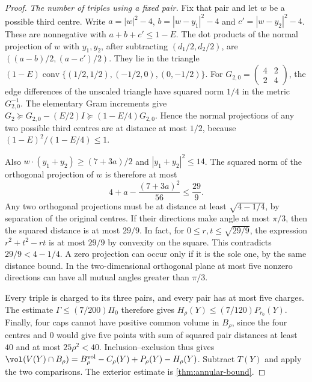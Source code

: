 \begin{proof}
\emph{The number of triples using a fixed pair.}
Fix that pair and let \(w\) be a possible third centre.
Write \(a=|w|^2-4\), \(b=|w-y_1|^2-4\) and
\(c'=|w-y_2|^2-4\). These are nonnegative with
\(a+b+c'\le1-E\).
The dot products of the normal projection of \(w\) with
\(y_1,y_2\), after subtracting \((d_1/2,d_2/2)\), are
\(((a-b)/2,(a-c')/2)\). They lie in the triangle
\((1-E)\operatorname{conv}\{(1/2,1/2),(-1/2,0),(0,-1/2)\}\).
For \(G_{2,0}=\left(\begin{smallmatrix}4&2\\2&4\end{smallmatrix}\right)\),
the edge differences of the unscaled triangle have squared
norm \(1/4\) in the metric \(G_{2,0}^{-1}\).
The elementary Gram increments give
\(G_2\succeq G_{2,0}-(E/2)I\succeq(1-E/4)G_{2,0}\).
Hence the normal projections of any two possible third centres
are at distance at most \(1/2\), because
\((1-E)^2/(1-E/4)\le1\).

Also \(w\cdot(y_1+y_2)\ge(7+3a)/2\) and
\(|y_1+y_2|^2\le14\).
The squared norm of the orthogonal projection of \(w\) is
therefore at most
\[
 4+a-\frac{(7+3a)^2}{56}\le\frac{29}{9}.
\]
Any two orthogonal projections must be at distance at least
\(\sqrt{4-1/4}\), by separation of the original centres.
If their directions make angle at most \(\pi/3\), then the
squared distance is at most \(29/9\). In fact, for
\(0\le r,t\le\sqrt{29/9}\), the expression \(r^2+t^2-rt\)
is at most \(29/9\) by convexity on the square.
This contradicts \(29/9<4-1/4\).
A zero projection can occur only if it is the sole one,
by the same distance bound. In the two-dimensional orthogonal
plane at most five nonzero directions can have all mutual
angles greater than \(\pi/3\).

Every triple is charged to its three pairs, and every pair has
at most five charges. The estimate \(\Gamma\le(7/200)\Pi_0\)
therefore gives \(H_\rho(Y)\le(7/120)P_{r_0}(Y)\).
Finally, four caps cannot have positive common volume in
\(B_\rho\), since the four centres and \(0\) would give five
points with sum of squared pair distances at least \(40\)
and at most \(25\rho^2<40\).
Inclusion--exclusion thus gives
\(\vol(V(Y)\cap B_\rho)=B_\rho^{\rm vol}-C_\rho(Y)+P_\rho(Y)-H_\rho(Y)\).
Subtract \(T(Y)\) and apply the two comparisons. The exterior
estimate is \cref{thm:annular-bound}.
\end{proof}

